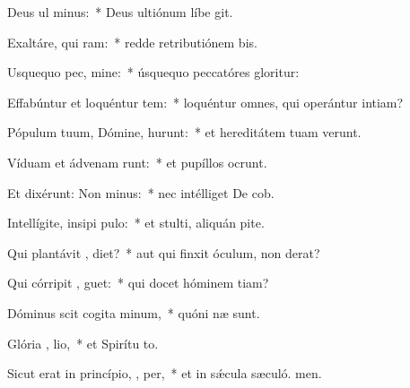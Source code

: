 \item Deus ul minus:~* Deus ultiónum líbe git.
\item Exaltáre, qui  ram:~* redde retributiónem bis.
\item Usquequo pec, mine:~* úsquequo peccatóres gloritur:
\item Effabúntur et loquéntur tem:~* loquéntur omnes, qui operántur intiam?
\item Pópulum tuum, Dómine, hurunt:~* et hereditátem tuam verunt.
\item Víduam et ádvenam runt:~* et pupíllos ocrunt.
\item Et dixérunt: Non  minus:~* nec intélliget De cob.
\item Intellígite, insipi  pulo:~* et stulti, aliquán pite.
\item Qui plantávit ,  diet?~* aut qui finxit óculum, non derat?
\item Qui córripit ,  guet:~* qui docet hóminem tiam?
\item Dóminus scit cogita minum,~* quóni næ sunt.
\item Glória ,  lio,~* et Spirítu to.
\item Sicut erat in princípio,  ,  per,~* et in sǽcula sæculó. men.
